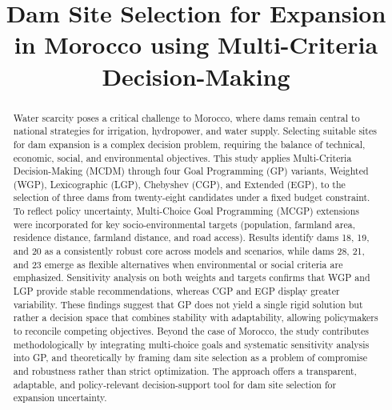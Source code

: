 \begin{frontmatter}
    \title{Dam Site Selection for Expansion in Morocco using Multi-Criteria Decision-Making}




\begin{abstract}
Water scarcity poses a critical challenge to Morocco, where dams remain central to national strategies for irrigation, hydropower, and water supply. Selecting suitable sites for dam expansion is a complex decision problem, requiring the balance of technical, economic, social, and environmental objectives. This study applies Multi-Criteria Decision-Making (MCDM) through four Goal Programming (GP) variants, Weighted (WGP), Lexicographic (LGP), Chebyshev (CGP), and Extended (EGP), to the selection of three dams from twenty-eight candidates under a fixed budget constraint. To reflect policy uncertainty, Multi-Choice Goal Programming (MCGP) extensions were incorporated for key socio-environmental targets (population, farmland area, residence distance, farmland distance, and road access). Results identify dams 18, 19, and 20 as a consistently robust core across models and scenarios, while dams 28, 21, and 23 emerge as flexible alternatives when environmental or social criteria are emphasized. Sensitivity analysis on both weights and targets confirms that WGP and LGP provide stable recommendations, whereas CGP and EGP display greater variability. These findings suggest that GP does not yield a single rigid solution but rather a decision space that combines stability with adaptability, allowing policymakers to reconcile competing objectives. Beyond the case of Morocco, the study contributes methodologically by integrating multi-choice goals and systematic sensitivity analysis into GP, and theoretically by framing dam site selection as a problem of compromise and robustness rather than strict optimization. The approach offers a transparent, adaptable, and policy-relevant decision-support tool for dam site selection for expansion uncertainty.    
\end{abstract}



\end{frontmatter}
